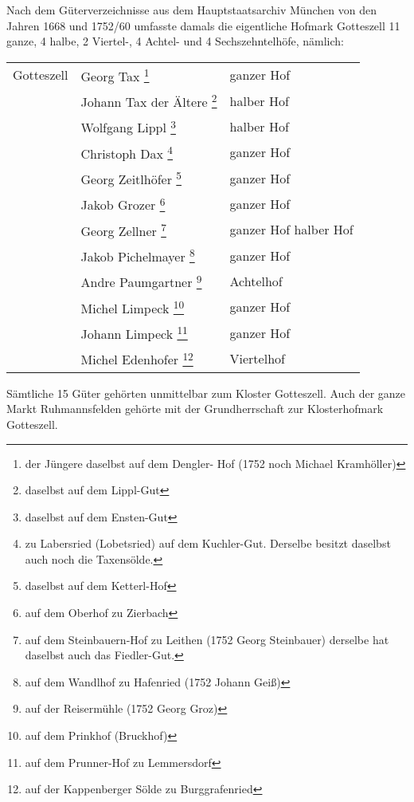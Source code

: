 \documentclass{book}
\begin{document}
Nach dem Güterverzeichnisse aus dem Hauptstaatsarchiv München von den
Jahren 1668 und 1752/60 umfasste damals die eigentliche Hofmark
Gotteszell 11 ganze, 4 halbe, 2 Viertel-, 4 Achtel- und 4
Sechszehntelhöfe, nämlich:

\begin{longtable}{l|l|l}
Gotteszell & Georg Tax \footnote{der Jüngere daselbst auf dem Dengler-
Hof (1752 noch Michael Kramhöller)} & ganzer Hof\\

& Johann Tax der Ältere \footnote{daselbst auf dem Lippl-Gut} & halber
Hof\\

& Wolfgang Lippl \footnote{daselbst auf dem Ensten-Gut} & halber Hof\\

& Christoph Dax \footnote{zu Labersried (Lobetsried) auf dem Kuchler-Gut.
Derselbe besitzt daselbst auch noch die Taxensölde.} & ganzer Hof\\

& Georg Zeitlhöfer \footnote{daselbst auf dem Ketterl-Hof} & ganzer
Hof\\

& Jakob Grozer \footnote{auf dem Oberhof zu Zierbach} & ganzer Hof\\

& Georg Zellner \footnote{auf dem Steinbauern-Hof zu Leithen (1752 Georg
Steinbauer) derselbe hat daselbst auch das Fiedler-Gut.} & ganzer Hof
halber Hof\\

& Jakob Pichelmayer \footnote{auf dem Wandlhof zu Hafenried (1752 Johann
Geiß)} & ganzer Hof\\

& Andre Paumgartner \footnote{auf der Reisermühle (1752 Georg Groz)} &
Achtelhof\\

& Michel Limpeck \footnote{auf dem Prinkhof (Bruckhof)} & ganzer Hof\\

& Johann Limpeck \footnote{auf dem Prunner-Hof zu Lemmersdorf} & ganzer
Hof\\

& Michel Edenhofer \footnote{auf der Kappenberger Sölde zu
Burggrafenried} & Viertelhof\\
\end{longtable}

Sämtliche 15 Güter gehörten unmittelbar zum Kloster Gotteszell. Auch der
ganze Markt Ruhmannsfelden gehörte mit der Grundherrschaft zur
Klosterhofmark Gotteszell.
\end{document}
